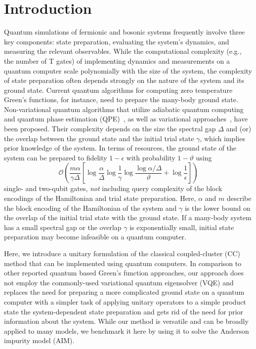 \documentclass[aip,reprint,table,xcdraw,usenames,dvipsnames]{revtex4-1}
\begin{document}
\section{Introduction} 
Quantum simulations of fermionic and bosonic systems frequently involve three key components: state preparation, evaluating the system's dynamics, and measuring the relevant observables. While the computational complexity (e.g., the number of T gates) of implementing dynamics and measurements on a quantum computer scale polynomially with the size of the system, the complexity of state preparation often depends strongly on the nature of the system and its ground state. Current quantum algorithms for computing zero temperature Green's functions, for instance, need to prepare the many-body ground state. Non-variational quantum algorithms that utilize adiabatic quantum computing and quantum phase estimation (QPE)~\cite{Bauer2016}, as well as variational approaches~\cite{Wecker2015, Peruzzo2014,PhysRevResearch.2.033281}, have been proposed. Their complexity depends on the size the spectral gap $\Delta$ and (or) the overlap between the ground state and the initial trial state $\gamma$, which implies prior knowledge of the system. In terms of resources, the ground state of the system can be prepared to fidelity $1-\epsilon$ with probability $1-\vartheta$ using\cite{Lin2020nearoptimalground} 
\begin{equation*}
 \mathcal{O} \left( \frac{m\alpha}{\gamma \Delta} \left[ \log \frac{\alpha}{\Delta} \log\frac{1}{\gamma} \log \frac{\log\alpha/\Delta}{\vartheta} + \log\frac{1}{\epsilon} \right] \right)
\end{equation*}
single- and two-qubit gates, \emph{not} including query complexity of the block encodings of the Hamiltonian and trial state preparation. Here, $\alpha$ and $m$ describe the block encoding of the Hamiltonian of the system and $\gamma$ is the lower bound on the overlap of the initial trial state with the ground state. If a many-body system has a small spectral gap or the overlap $\gamma$ is exponentially small, initial state preparation may become infeasible on a quantum computer.

Here, we introduce a unitary formulation of the classical coupled-cluster (CC) method that can be implemented using quantum computers. In comparison to other reported quantum based Green's function approaches\cite{Kosugi2020, Endo2020}, our approach does not employ the commonly-used variational quantum eigensolver (VQE) and replaces the need for preparing a more complicated ground state on a quantum computer with a simpler task of applying unitary operators to a simple product state the system-dependent state preparation and gets rid of the need for prior information about the system. While our method is versatile and can be broadly applied to many models, we benchmark it here by using it to solve the Anderson impurity model (AIM). 
\end{document}
